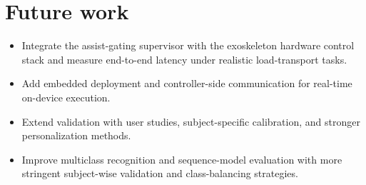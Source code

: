 \section{Future work}
\begin{itemize}
  \item Integrate the assist-gating supervisor with the exoskeleton hardware control stack and measure end-to-end latency under realistic load-transport tasks.
  \item Add embedded deployment and controller-side communication for real-time on-device execution.
  \item Extend validation with user studies, subject-specific calibration, and stronger personalization methods.
  \item Improve multiclass recognition and sequence-model evaluation with more stringent subject-wise validation and class-balancing strategies.
\end{itemize}
